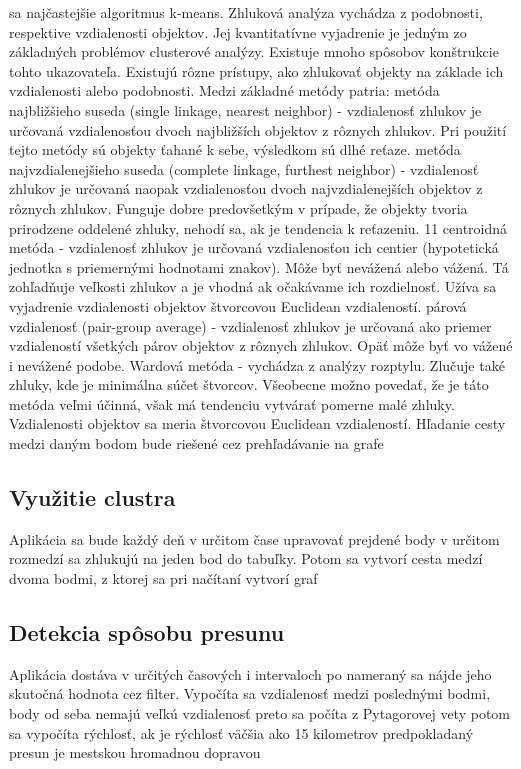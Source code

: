 sa najčastejšie algoritmus k-means.
Zhluková analýza vychádza z podobnosti, respektive vzdialenosti objektov. Jej kvantitatívne
vyjadrenie je jedným zo základných problémov clusterové analýzy. Existuje mnoho spôsobov
konštrukcie tohto ukazovateľa.
Existujú rôzne prístupy, ako zhlukovať objekty na základe ich vzdialenosti alebo podobnosti.
Medzi základné metódy patria:
metóda najbližšieho suseda (single linkage, nearest neighbor) - vzdialenosť zhlukov je
určovaná vzdialenosťou dvoch najbližších objektov z rôznych zhlukov. Pri použití tejto
metódy sú objekty ťahané k sebe, výsledkom sú dlhé reťaze.
metóda najvzdialenejšieho suseda (complete linkage, furthest neighbor) - vzdialenosť
zhlukov je určovaná naopak vzdialenosťou dvoch najvzdialenejších objektov z rôznych
zhlukov. Funguje dobre predovšetkým v prípade, že objekty tvoria prirodzene oddelené
zhluky, nehodí sa, ak je tendencia k reťazeniu.
11
centroidná metóda - vzdialenosť zhlukov je určovaná vzdialenosťou ich centier (hypotetická
jednotka s priemernými hodnotami znakov). Môže byť nevážená alebo vážená. Tá
zohľadňuje veľkosti zhlukov a je vhodná ak očakávame ich rozdielnosť. Užíva sa vyjadrenie
vzdialenosti objektov štvorcovou Euclidean vzdialeností.
párová vzdialenosť (pair-group average) - vzdialenosť zhlukov je určovaná ako priemer
vzdialeností všetkých párov objektov z rôznych zhlukov. Opäť môže byť vo vážené i
nevážené podobe.
Wardová metóda - vychádza z analýzy rozptylu. Zlučuje také zhluky, kde je minimálna súčet
štvorcov. Všeobecne možno povedať, že je táto metóda veľmi účinná, však má tendenciu
vytvárať pomerne malé zhluky. Vzdialenosti objektov sa meria štvorcovou Euclidean
vzdialeností.
Hľadanie cesty medzi daným bodom bude riešené cez prehľadávanie na grafe

\subsection{Využitie clustra}

Aplikácia sa bude každý deň v určitom čase upravovať prejdené body v určitom rozmedzí sa
zhlukujú na jeden bod do tabuľky. Potom sa vytvorí cesta medzí dvoma bodmi, z ktorej sa pri
načítaní vytvorí graf


\subsection{Detekcia spôsobu presunu}

Aplikácia dostáva v určitých časových i intervaloch po nameraný sa nájde jeho skutočná
hodnota cez filter. Vypočíta sa vzdialenosť medzi poslednými bodmi, body od seba nemajú
veľkú vzdialenosť preto sa počíta z Pytagorovej vety potom sa vypočíta rýchlosť, ak je
rýchlosť väčšia ako 15 kilometrov predpokladaný presun je mestskou hromadnou dopravou


